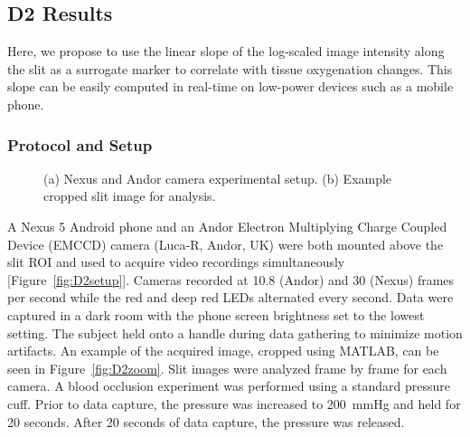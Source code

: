 \subsection{D2 Results}
Here, we propose to use the linear slope of the log-scaled image intensity along the slit as a surrogate marker to correlate with tissue oxygenation changes. This slope can be easily computed in real-time on low-power devices such as a mobile phone.
    
\subsubsection{Protocol and Setup}
\begin{figure}
    \begin{center}
    \end{center}
    \caption{(a) Nexus and Andor camera experimental setup. (b) Example cropped slit image for analysis.} 
    \label{fig:D2protocol}
\end{figure} 
A Nexus 5 Android phone and an Andor Electron Multiplying Charge Coupled Device (EMCCD) camera (Luca-R, Andor, UK) were both mounted above the slit ROI and used to acquire video recordings simultaneously [Figure~\ref{fig:D2setup}]. Cameras recorded at 10.8 (Andor) and 30 (Nexus) frames per second while the red and deep red LEDs alternated every second. Data were captured in a dark room with the phone screen brightness set to the lowest setting. The subject held onto a handle during data gathering to minimize motion artifacts. An example of the acquired image, cropped using MATLAB, can be seen in Figure~\ref{fig:D2zoom}. Slit images were analyzed frame by frame for each camera. A blood occlusion experiment was performed using a standard pressure cuff. Prior to data capture, the pressure was increased to 200~mmHg and held for 20 seconds. After 20 seconds of data capture, the pressure was released. 
        
